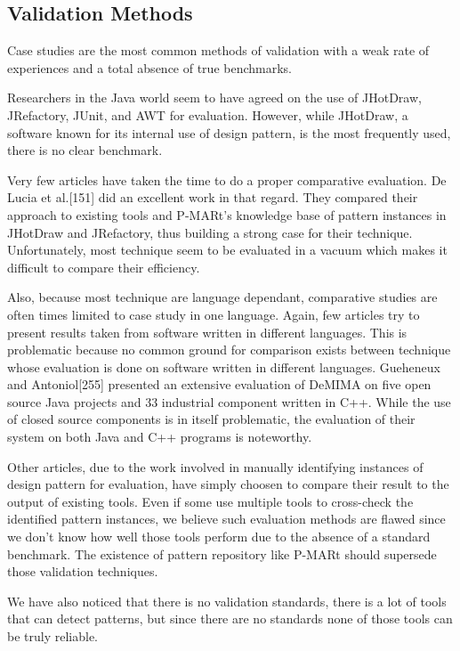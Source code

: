 \documentclass[letterpaper, 10 pt, conference]{ieeeconf}  %
\begin{document}
\subsection{Validation Methods}

Case studies are the most common methods of validation with a weak rate of
experiences and a total absence of true benchmarks.

Researchers in the Java world seem to have agreed on the use of JHotDraw,
JRefactory, JUnit, and AWT for evaluation.
However, while JHotDraw, a software known for its internal use of design
pattern, is the most frequently used, there is no clear benchmark.

Very few articles have taken the time to do a proper comparative evaluation.
De Lucia et al.[151] did an excellent work in that regard.
They compared their approach to existing tools and P-MARt's knowledge base
of pattern instances in JHotDraw and JRefactory, thus building a
strong case for their technique.
Unfortunately, most technique seem to be evaluated in a vacuum which makes it
difficult to compare their efficiency.

Also, because most technique are language dependant, comparative studies are
often times limited to case study in one language.
Again, few articles try to present results taken from software written in
different languages.
This is problematic because no common ground for comparison exists between
technique whose evaluation is done on software written in different languages.
Gueheneux and Antoniol[255] presented an extensive evaluation of DeMIMA on
five open source Java projects and 33 industrial component written in C++.
While the use of closed source components is in itself problematic, the
evaluation of their system on both Java and C++ programs is noteworthy.

Other articles, due to the work involved in manually identifying instances of
design pattern for evaluation, have simply choosen to compare their result to
the output of existing tools.
Even if some use multiple tools to cross-check the identified pattern instances,
we believe such evaluation methods are flawed since we don't know how well
those tools perform due to the absence of a standard benchmark.
The existence of pattern repository like P-MARt should supersede those
validation techniques.

We have also noticed that there is no validation standards, there is a lot
of tools that can detect patterns, but since there are no standards 
none of those tools can be truly reliable.
\end{document}
